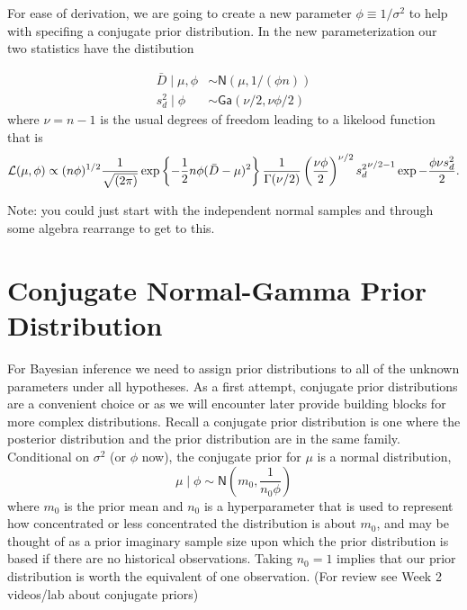 \documentclass[11pt]{article}
\def\No{\textsf{N}}
\def\Ga{\textsf{Ga}}
\begin{document}
For ease of derivation, we are going to create a new parameter $\phi \equiv 1/\sigma^2$ to help with specifing a conjugate prior distribution.  In the new parameterization our two statistics have the distibution

\begin{align}
 \bar{D} \mid \mu, \phi & \sim \No\left(\mu,  1/(\phi n)\right) \\
 s^2_d \mid \phi & \sim  \Ga(\nu/2,  \nu \phi/2 )
\end{align}
where $\nu = n-1 $ is the usual degrees of freedom leading to a likelood function that is 
$$
{\cal{L}}(\mu, \phi) \propto (n\phi)^{1/2} \frac{1}{\sqrt{(2 \pi)}} 
\exp\left\{- \frac 1 2  n \phi (\bar{D} - \mu)^2 \right\}
\frac{1 }{\Gamma(\nu/2)} \left(\frac{\nu \phi}{2}\right)^{\nu/2} {s^2_d}^{\nu/2 - 1} \exp{- \frac{\phi \nu s^2_d}{2}}.
$$

Note:  you could just start with the independent normal samples and through some algebra rearrange to get to this.
\section*{Conjugate Normal-Gamma Prior Distribution}


For Bayesian inference we need to assign prior distributions to all of the unknown parameters under all hypotheses. As a first attempt, conjugate prior distributions are a convenient choice or as we will encounter later provide building blocks for more complex distributions. Recall a conjugate prior distribution is one where the posterior distribution and the prior distribution are in the same family.  Conditional on $\sigma^2$ (or $\phi$ now), the conjugate prior for $\mu$ is a normal distribution,  
$$ \mu \mid \phi \sim \No \left(m_0, \frac{1}{n_0 \phi} \right)
$$
where $m_0$ is the prior mean and $n_0$ is a hyperparameter that is used to represent
how concentrated or less concentrated the distribution is about $m_0$, and may be
thought of as a prior imaginary sample size upon which the prior distribution is 
based if there are no historical observations. Taking $n_0 = 1$ implies that our prior distribution is worth the 
equivalent of one observation.  (For review see Week 2 videos/lab about conjugate priors)
\end{document}
